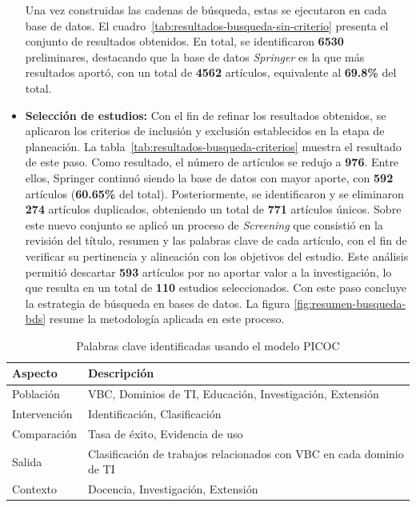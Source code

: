 \begin{itemize}
    Una vez construidas las cadenas de búsqueda, estas se ejecutaron en cada base de datos. El cuadro~\ref{tab:resultados-busqueda-sin-criterio} presenta el conjunto de resultados obtenidos. En total, se identificaron \textbf{6530} preliminares, destacando que la base de datos \textit{Springer} es la que más resultados aportó, con un total de \textbf{4562} artículos, equivalente al \textbf{69.8\%} del total.

    \item \textbf{Selección de estudios: } Con el fin de refinar los resultados obtenidos, se aplicaron los criterios de inclusión y exclusión establecidos en la etapa de planeación. La tabla~\ref{tab:resultados-busqueda-criterios} muestra el resultado de este paso. Como resultado, el número de artículos se redujo a \textbf{976}. Entre ellos, Springer continuó siendo la base de datos con mayor aporte, con \textbf{592} artículos (\textbf{60.65\%} del total). Posteriormente, se identificaron y se eliminaron \textbf{274} artículos duplicados, obteniendo un total de \textbf{771} artículos únicos. Sobre este nuevo conjunto se aplicó un proceso de \textit{Screening} que consistió en la revisión del título, resumen y las palabras clave de cada artículo, con el fin de verificar su pertinencia y alineación con los objetivos del estudio.
    Este análisis permitió descartar \textbf{593} artículos por no aportar valor a la investigación, lo que resulta en un total de \textbf{110} estudios seleccionados. Con este paso concluye la estrategia de búsqueda en bases de datos. La figura \ref{fig:resumen-busqueda-bds} resume la metodología aplicada en este proceso.\\
\end{itemize}

\begin{table}[tbp]
    \scriptsize %
    \centering
    \renewcommand{\arraystretch}{1.3}
    \begin{tabularx}{\columnwidth}{>{\centering\arraybackslash}m{} >{\RaggedRight\arraybackslash}X}
        \hline
        \textbf{Aspecto} & \textbf{Descripción} \\
        \hline
        Población & VBC, Dominios de TI, Educación, Investigación, Extensión \\
        Intervención & Identificación, Clasificación \\
        Comparación & Tasa de éxito, Evidencia de uso \\
        Salida & Clasificación de trabajos relacionados con VBC en cada dominio de TI \\
        Contexto & Docencia, Investigación, Extensión \\
        \hline
    \end{tabularx}
    \caption{Palabras clave identificadas usando el modelo PICOC}\label{tab:palabras-clave}
\end{table}

